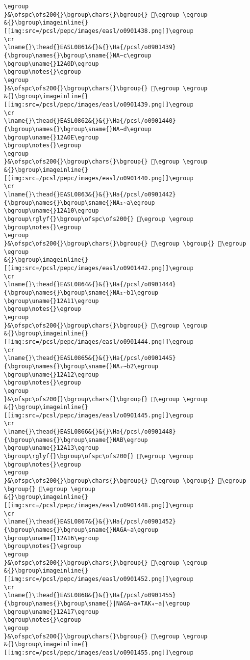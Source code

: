 \begin{verbatim}
\egroup
}&\ofspc\ofs200{}\bgroup\chars{}\bgroup{} 𒨌\egroup \egroup
&{}\bgroup\imageinline{}[[img:src=/pcsl/pepc/images/easl/o0901438.png]]\egroup
\cr
\lname{}\thead{}EASL0861&{}&{}\Ha{/pcsl/o0901439}{\bgroup\names{}\bgroup\sname{}NA∼c\egroup
\bgroup\uname{}12A0D\egroup
\bgroup\notes{}\egroup
\egroup
}&\ofspc\ofs200{}\bgroup\chars{}\bgroup{} 𒨍\egroup \egroup
&{}\bgroup\imageinline{}[[img:src=/pcsl/pepc/images/easl/o0901439.png]]\egroup
\cr
\lname{}\thead{}EASL0862&{}&{}\Ha{/pcsl/o0901440}{\bgroup\names{}\bgroup\sname{}NA∼d\egroup
\bgroup\uname{}12A0E\egroup
\bgroup\notes{}\egroup
\egroup
}&\ofspc\ofs200{}\bgroup\chars{}\bgroup{} 𒨎\egroup \egroup
&{}\bgroup\imageinline{}[[img:src=/pcsl/pepc/images/easl/o0901440.png]]\egroup
\cr
\lname{}\thead{}EASL0863&{}&{}\Ha{/pcsl/o0901442}{\bgroup\names{}\bgroup\sname{}NA₂∼a\egroup
\bgroup\uname{}12A10\egroup
\bgroup\rglyf{}\bgroup\ofspc\ofs200{} 𒨐\egroup \egroup
\bgroup\notes{}\egroup
\egroup
}&\ofspc\ofs200{}\bgroup\chars{}\bgroup{} 𒨏\egroup \bgroup{} 𒨐\egroup \egroup
&{}\bgroup\imageinline{}[[img:src=/pcsl/pepc/images/easl/o0901442.png]]\egroup
\cr
\lname{}\thead{}EASL0864&{}&{}\Ha{/pcsl/o0901444}{\bgroup\names{}\bgroup\sname{}NA₂∼b1\egroup
\bgroup\uname{}12A11\egroup
\bgroup\notes{}\egroup
\egroup
}&\ofspc\ofs200{}\bgroup\chars{}\bgroup{} 𒨑\egroup \egroup
&{}\bgroup\imageinline{}[[img:src=/pcsl/pepc/images/easl/o0901444.png]]\egroup
\cr
\lname{}\thead{}EASL0865&{}&{}\Ha{/pcsl/o0901445}{\bgroup\names{}\bgroup\sname{}NA₂∼b2\egroup
\bgroup\uname{}12A12\egroup
\bgroup\notes{}\egroup
\egroup
}&\ofspc\ofs200{}\bgroup\chars{}\bgroup{} 𒨒\egroup \egroup
&{}\bgroup\imageinline{}[[img:src=/pcsl/pepc/images/easl/o0901445.png]]\egroup
\cr
\lname{}\thead{}EASL0866&{}&{}\Ha{/pcsl/o0901448}{\bgroup\names{}\bgroup\sname{}NAB\egroup
\bgroup\uname{}12A13\egroup
\bgroup\rglyf{}\bgroup\ofspc\ofs200{} 𒨓\egroup \egroup
\bgroup\notes{}\egroup
\egroup
}&\ofspc\ofs200{}\bgroup\chars{}\bgroup{} 𒨓\egroup \bgroup{} 𒨔\egroup \bgroup{} 𒨕\egroup \egroup
&{}\bgroup\imageinline{}[[img:src=/pcsl/pepc/images/easl/o0901448.png]]\egroup
\cr
\lname{}\thead{}EASL0867&{}&{}\Ha{/pcsl/o0901452}{\bgroup\names{}\bgroup\sname{}NAGA∼a\egroup
\bgroup\uname{}12A16\egroup
\bgroup\notes{}\egroup
\egroup
}&\ofspc\ofs200{}\bgroup\chars{}\bgroup{} 𒨖\egroup \egroup
&{}\bgroup\imageinline{}[[img:src=/pcsl/pepc/images/easl/o0901452.png]]\egroup
\cr
\lname{}\thead{}EASL0868&{}&{}\Ha{/pcsl/o0901455}{\bgroup\names{}\bgroup\sname{}|NAGA∼a×TAK₄∼a|\egroup
\bgroup\uname{}12A17\egroup
\bgroup\notes{}\egroup
\egroup
}&\ofspc\ofs200{}\bgroup\chars{}\bgroup{} 𒨗\egroup \egroup
&{}\bgroup\imageinline{}[[img:src=/pcsl/pepc/images/easl/o0901455.png]]\egroup

\end{verbatim}

